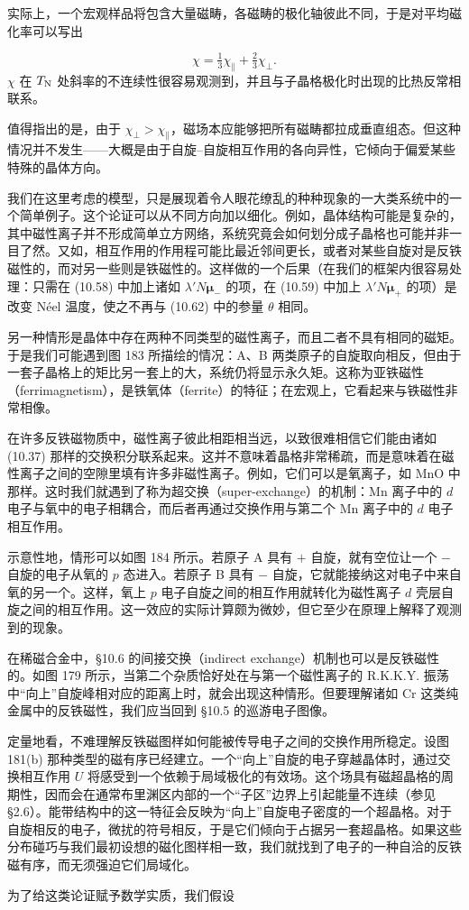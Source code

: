 实际上，一个宏观样品将包含大量磁畴，各磁畴的极化轴彼此不同，于是对平均磁化率可以写出

\begin{equation*}
\chi = \tfrac{1}{3}\chi_\parallel + \tfrac{2}{3}\chi_\perp. \tag{10.66}
\end{equation*}
$\chi$ 在 $T_{\rm N}$ 处斜率的不连续性很容易观测到，并且与子晶格极化时出现的比热反常相联系。

值得指出的是，由于 $\chi_\perp > \chi_\parallel$，磁场本应能够把所有磁畴都拉成垂直组态。但这种情况并不发生——大概是由于自旋–自旋相互作用的各向异性，它倾向于偏爱某些特殊的晶体方向。

我们在这里考虑的模型，只是展现着令人眼花缭乱的种种现象的一大类系统中的一个简单例子。这个论证可以从不同方向加以细化。例如，晶体结构可能是复杂的，其中磁性离子并不形成简单立方网络，系统究竟会如何划分成子晶格也可能并非一目了然。又如，相互作用的作用程可能比最近邻间更长，或者对某些自旋对是反铁磁性的，而对另一些则是铁磁性的。这样做的一个后果（在我们的框架内很容易处理：只需在 (10.58) 中加上诸如 $\lambda' N\boldsymbol{\mu}_-$ 的项，在 (10.59) 中加上 $\lambda' N\boldsymbol{\mu}_+$ 的项）是改变 Néel 温度，使之不再与 (10.62) 中的参量 $\theta$ 相同。



另一种情形是晶体中存在两种不同类型的磁性离子，而且二者不具有相同的磁矩。于是我们可能遇到图 183 所描绘的情况：A、B 两类原子的自旋取向相反，但由于一套子晶格上的矩比另一套上的大，系统仍将显示永久矩。这称为亚铁磁性（ferrimagnetism），是铁氧体（ferrite）的特征；在宏观上，它看起来与铁磁性非常相像。

在许多反铁磁物质中，磁性离子彼此相距相当远，以致很难相信它们能由诸如 (10.37) 那样的交换积分联系起来。这并不意味着晶格非常稀疏，而是意味着在磁性离子之间的空隙里填有许多非磁性离子。例如，它们可以是氧离子，如 MnO 中那样。这时我们就遇到了称为超交换（super-exchange）的机制：Mn 离子中的 $d$ 电子与氧中的电子相耦合，而后者再通过交换作用与第二个 Mn 离子中的 $d$ 电子相互作用。

示意性地，情形可以如图 184 所示。若原子 A 具有 $+$ 自旋，就有空位让一个 $-$ 自旋的电子从氧的 $p$ 态进入。若原子 B 具有 $-$ 自旋，它就能接纳这对电子中来自氧的另一个。这样，氧上 $p$ 电子自旋之间的相互作用就转化为磁性离子 $d$ 壳层自旋之间的相互作用。这一效应的实际计算颇为微妙，但它至少在原理上解释了观测到的现象。

在稀磁合金中，§10.6 的间接交换（indirect exchange）机制也可以是反铁磁性的。如图 179 所示，当第二个杂质恰好处在与第一个磁性离子的 R.K.K.Y. 振荡中“向上”自旋峰相对应的距离上时，就会出现这种情形。但要理解诸如 Cr 这类纯金属中的反铁磁性，我们应当回到 §10.5 的巡游电子图像。

定量地看，不难理解反铁磁图样如何能被传导电子之间的交换作用所稳定。设图 181(b) 那种类型的磁有序已经建立。一个“向上”自旋的电子穿越晶体时，通过交换相互作用 $U$ 将感受到一个依赖于局域极化的有效场。这个场具有磁超晶格的周期性，因而会在通常布里渊区内部的一个“子区”边界上引起能量不连续（参见 §2.6）。能带结构中的这一特征会反映为“向上”自旋电子密度的一个超晶格。对于自旋相反的电子，微扰的符号相反，于是它们倾向于占据另一套超晶格。如果这些分布碰巧与我们最初设想的磁化图样相一致，我们就找到了电子的一种自洽的反铁磁有序，而无须强迫它们局域化。

为了给这类论证赋予数学实质，我们假设

